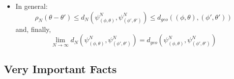 \documentclass{article}
\begin{document}
\begin{itemize}
    \item In general:
    \begin{equation}
        \rho_N(\theta - \theta') \leq d_N(\psi^N_{(\phi, \theta)}, \psi^N_{(\phi', \theta')}) \leq d_{geo}((\phi, \theta), (\phi', \theta'))
    \end{equation} and, finally,
    \begin{equation}
        \lim_{N \to \infty} d_N(\psi^N_{(\phi, \theta)}, \psi^N_{(\phi', \theta')}) = d_{geo}(\psi^N_{(\phi, \theta)}, \psi^N_{(\phi', \theta')})
    \end{equation}
    
    \end{itemize}

\subsection{Very Important Facts} %
\end{document}
